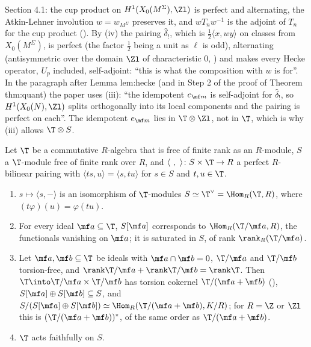\begin{paperlink}\label{pl:modules:adjoint}
Section 4.1: the cup product on $H^1(X_0(M^\Sigma),\Zl)$ is perfect and alternating, the Atkin-Lehner involution $w=w_{M^\Sigma}$ preserves it, and
$wT_nw^{-1}$ is the adjoint of $T_n$ for the cup product (). By (iv) the pairing
$\hat\delta_!$, which is $\frac12\langle x,wy\rangle$ on classes from $X_0(M^\Sigma)$, is perfect (the factor $\frac12$ being a unit as $\ell$ is odd),
alternating (antisymmetric over the domain $\Zl$ of characteristic $0$, ) and makes every Hecke operator, $U_p$ included, self-adjoint: ``this is what the
composition with $w$ is for''. In the paragraph after Lemma lem:hecke (and in Step 2 of the proof of Theorem thm:quant) the paper uses
(iii): ``the idempotent $e_{\mf m}$ is self-adjoint for $\hat\delta_!$, so $H^1(X_0(N),\Zl)$ splits orthogonally into its local
components and the pairing is perfect on each''. The idempotent $e_{\mf m}$ lies in $\T\otimes\Zl$, not in $\T$, which is why (iii) allows $\T\otimes S$.
\end{paperlink}

\begin{proposition}\label{prop:modules:algebra-duality}
Let $\T$ be a commutative $R$-algebra that is free of finite rank as an $R$-module, $S$ a $\T$-module free of finite rank over $R$, and
$\langle\ ,\ \rangle\colon S\times\T\to R$ a perfect $R$-bilinear pairing with $\langle ts,u\rangle=\langle s,tu\rangle$ for $s\in S$ and $t,u\in\T$.
\begin{enumerate}[label=(\roman*)]
\item $s\mapsto\langle s,-\rangle$ is an isomorphism of $\T$-modules $S\simeq\T^\vee=\Hom_R(\T,R)$, where $(t\varphi)(u)=\varphi(tu)$.
\item For every ideal $\mf a\subseteq\T$, $S[\mf a]$ corresponds to $\Hom_R(\T/\mf a,R)$, the functionals vanishing on $\mf a$; it is saturated in $S$, of rank
$\rank_R(\T/\mf a)$.
\item Let $\mf a,\mf b\subseteq\T$ be ideals with $\mf a\cap\mf b=0$, $\T/\mf a$ and $\T/\mf b$ torsion-free, and $\rank\T/\mf a+\rank\T/\mf b=\rank\T$. Then
$\T\into\T/\mf a\times\T/\mf b$ has torsion cokernel $\T/(\mf a+\mf b)$ (), $S[\mf a]\oplus S[\mf b]\subseteq S$, and
$S/(S[\mf a]\oplus S[\mf b])\simeq\Hom_R(\T/(\mf a+\mf b),K/R)$; for $R=\Z$ or $\Zl$ this is $(\T/(\mf a+\mf b))^*$, of the same order as $\T/(\mf a+\mf b)$.
\item $\T$ acts faithfully on $S$.
\end{enumerate}
\end{proposition}

